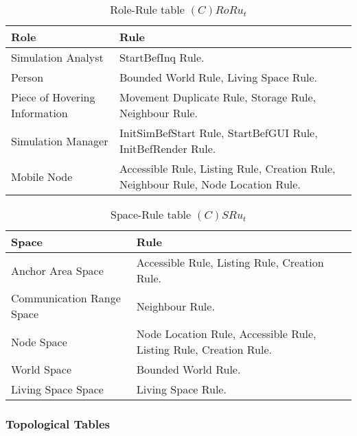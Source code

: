 \begin{table}[H]
	\centering
	\begin{tabular}{|p{4cm}|p{8cm}|}
			\hline
			\textbf{Role} & \textbf{Rule} \\
			\hline
			Simulation Analyst & StartBefInq Rule. \\
			\hline
			Person & Bounded World Rule, Living Space Rule. \\
			\hline
			Piece of Hovering Information &  Movement Duplicate
			Rule, Storage Rule, Neighbour Rule. \\
			\hline
			Simulation Manager & InitSimBefStart Rule, StartBefGUI Rule,
			InitBefRender Rule. \\
			\hline
			Mobile Node & Accessible Rule, Listing Rule, Creation Rule, Neighbour
			Rule, Node Location Rule. \\
			\hline
		\end{tabular}
	\caption{Role-Rule table $(C)RoRu_t$}
	\label{tab:crorut}
\end{table}

\begin{table}[H]
	\centering
	\begin{tabular}{|p{4cm}|p{8cm}|}
			\hline
			\textbf{Space} & \textbf{Rule} \\
			\hline
			Anchor Area Space & Accessible Rule, Listing Rule, Creation Rule. \\
			\hline
			Communication Range Space & Neighbour Rule. \\
			\hline
			Node Space & Node Location Rule, Accessible Rule, Listing Rule, Creation Rule. \\
			\hline
			World Space & Bounded World Rule. \\
			\hline
			Living Space Space & Living Space Rule. \\
			\hline
		\end{tabular}
	\caption{Space-Rule table $(C)SRu_t$}
	\label{tab:cot}
\end{table}

\subsubsection{Topological Tables}

